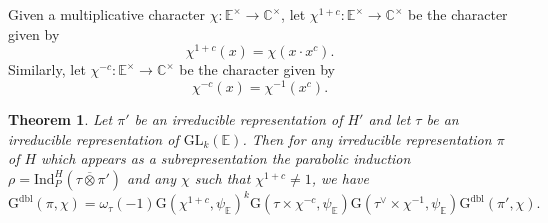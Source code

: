 \documentclass[12pt, reqno]{amsart}
\newtheorem{theorem}{Theorem}[section]
\theoremstyle{definition}
\theoremstyle{definition}
\theoremstyle{definition}
\newcommand{\cComplex}{\mathbb{C}}
\newcommand{\multiplicativegroup}[1]{#1^{\times}}
\newcommand{\fieldCharacter}{\psi}
\newcommand{\centralCharacter}[1]{\omega_{#1}}
\newcommand{\Ind}[3]{\mathrm{Ind}_{#1}^{#2}\left(#3\right)}
\newcommand{\Contragradient}[1]{#1^{\vee}}
\newcommand{\involution}[1]{#1^{c}}
\newcommand{\minusInvolution}[1]{#1^{-c}}
\newcommand{\involutionPlusOne}[1]{#1^{1+c}}
\newcommand{\GL}{\mathrm{GL}}
\newcommand{\quadraticExtension}{\mathbb{E}}
\newcommand{\GaussSumScalar}[2]{\mathrm{G}\left(#1, #2\right)}
\newcommand{\dblGaussSumScalar}[2]{\mathrm{G}^{\mathrm{dbl}}\left(#1, #2\right)}
\begin{document}
Given a multiplicative character $\chi \colon \multiplicativegroup{\quadraticExtension} \to \multiplicativegroup{\cComplex}$, let $\involutionPlusOne{\chi} \colon \multiplicativegroup{\quadraticExtension} \to \multiplicativegroup{\cComplex}$ be the character given by
$$\involutionPlusOne{\chi}\left(x\right) = \chi\left(x \cdot \involution{x}\right).$$ Similarly, let $\minusInvolution{\chi} \colon \multiplicativegroup{\quadraticExtension} \to \multiplicativegroup{\cComplex}$ be the character given by
$$\minusInvolution{\chi}\left(x\right) = \chi^{-1}\left(\involution{x}\right).$$

\begin{theorem}\label{thm:multiplicativity-in-terms-of-gauss-sums}
	Let $\pi'$ be an irreducible representation of $H'$ and let $\tau$ be an irreducible representation of $\GL_k\left(\quadraticExtension\right)$. Then for any irreducible representation $\pi$ of $H$ which appears as a subrepresentation the parabolic induction $\rho = \Ind{P}{H}{\tau \overline{\otimes} \pi'}$ and any $\chi$ such that $\involutionPlusOne{\chi} \ne 1$, we have
	$$\dblGaussSumScalar{\pi}{\chi} = \centralCharacter{\tau}\left(-1\right) \GaussSumScalar{\involutionPlusOne{\chi}}{\fieldCharacter_{\quadraticExtension}}^k \GaussSumScalar{\tau \times \minusInvolution{\chi}}{\fieldCharacter_{\quadraticExtension}} \GaussSumScalar{\Contragradient{\tau} \times \chi^{-1}}{\fieldCharacter_{\quadraticExtension}} \dblGaussSumScalar{\pi'}{\chi}.$$
\end{theorem}
\end{document}
